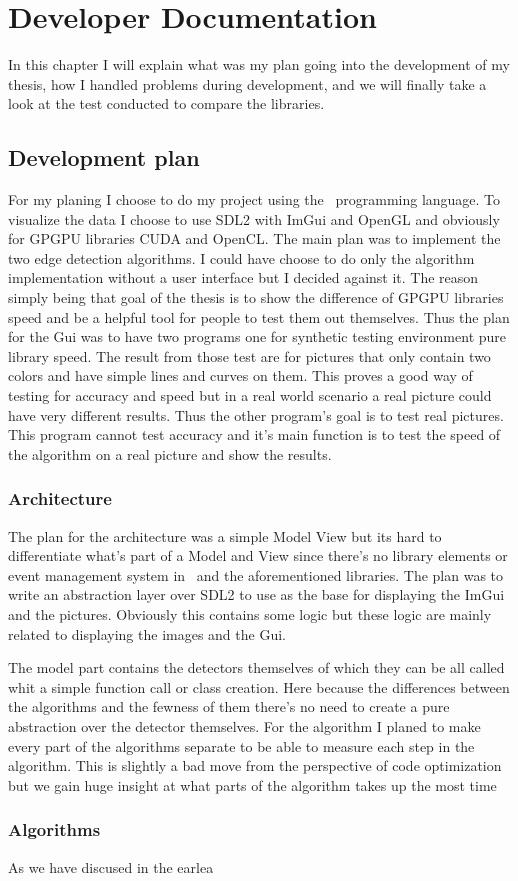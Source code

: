 \chapter{Developer Documentation}

In this chapter I will explain what was my plan going into the development of my thesis, how I handled problems during development, and we will finally take a look at the test conducted to compare the libraries.

\section{Development plan}

For my planing I choose to do my project using the \CC\ programming language. To visualize the data I choose to use \ac{SDL2} with \ac{ImGui} and OpenGL and obviously for \ac{GPGPU} libraries CUDA and OpenCL. The main plan was to implement the two edge detection algorithms. I could have choose to do only the algorithm implementation without a user interface but I decided against it. The reason simply being that goal of the thesis is to show the difference of \ac{GPGPU} libraries speed and be a helpful tool for people to test them out themselves. Thus the plan for the Gui was to have two programs one for synthetic testing environment pure library speed. The result from those test are for pictures that only contain two colors and have simple lines and curves on them. This proves a good way of testing for accuracy and speed but in a real world scenario a real picture could have very different results. Thus the other program's goal is to test real pictures. This program cannot test accuracy and it's main function is to test the speed of the algorithm on a real picture and show the results.


\subsection{Architecture}

The plan for the architecture was a simple Model View but its hard to differentiate what's part of a Model and View since there's no library elements or event management system in \CC\ and the aforementioned libraries. The plan was to write an abstraction layer over \ac{SDL2} to use as the base for displaying the \ac{ImGui} and the pictures. Obviously this contains some logic but these logic are mainly related to displaying the images and the Gui.

The model part contains the detectors themselves of which they can be all called whit a simple function call or class creation. Here because the differences between the algorithms and the fewness of them there's no need to create a pure abstraction over the detector themselves. For the algorithm I planed to make every part of the algorithms separate to be able to measure each step in the algorithm. This is slightly a bad move from the perspective of code optimization but we gain huge insight at what parts of the algorithm takes up the most time

\subsection{Algorithms}

As we have discused in the earlea
